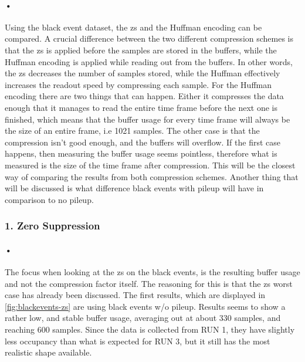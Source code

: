 \documentclass[a4paper, 12pt]{report}
\begin{document}
\paragraph{•}
Using the black event dataset, the \gls{zs} and the Huffman encoding can be compared.
A crucial difference between the two different compression schemes is that the \gls{zs} is applied before the samples are stored in the buffers, while the Huffman encoding is applied while reading out from the buffers.
In other words, the \gls{zs} decreases the number of samples stored, while the Huffman effectively increases the readout speed by compressing each sample.
For the Huffman encoding there are two things that can happen.
Either it compresses the data enough that it manages to read the entire time frame before the next one is finished, which means that the buffer usage for every time frame will always be the size of an entire frame, i.e 1021 samples.
The other case is that the compression isn't good enough, and the buffers will overflow.
If the first case happens, then measuring the buffer usage seems pointless, therefore what is measured is the size of the time frame after compression.
This will be the closest way of comparing the results from both compression schemes.
Another thing that will be discussed is what difference black events with pileup will have in comparison to no pileup.


\subsubsection{1. Zero Suppression}

\paragraph{•}
The focus when looking at the \gls{zs} on the black events, is the resulting buffer usage and not the compression factor itself.
The reasoning for this is that the \gls{zs} worst case has already been discussed.
The first results, which are displayed in \ref{fig:blackevents-zs} are using black events w/o pileup.
Results seems to show a rather low, and stable buffer usage, averaging out at about 330 samples, and reaching 600 samples.
Since the data is collected from RUN 1, they have slightly less occupancy than what is expected for RUN 3, but it still has the most realistic shape available.
\end{document}
